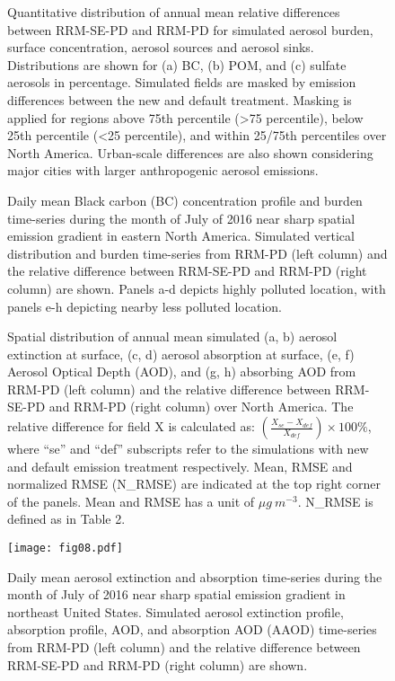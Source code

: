 \documentclass[journal abbreviation, manuscript]{copernicus}
\begin{document}
\clearpage
\begin{figure}[t]
\caption{Quantitative distribution of annual mean relative differences between RRM-SE-PD and RRM-PD for simulated aerosol burden, surface concentration, aerosol sources and aerosol sinks. Distributions are shown for (a) BC, (b) POM, and (c) sulfate aerosols in percentage. Simulated fields are masked by emission differences between the new and default treatment. Masking is applied for regions above 75th percentile (>75 percentile), below 25th percentile (<25 percentile), and within 25/75th percentiles over North America. Urban-scale differences are also shown considering major cities with larger anthropogenic aerosol emissions.}
\end{figure}

\clearpage
\begin{figure}[t]
\caption{Daily mean Black carbon (BC) concentration profile and burden time-series during the month of July of 2016 near sharp spatial emission gradient in eastern North America. Simulated vertical distribution and burden time-series from RRM-PD (left column) and the relative difference between RRM-SE-PD and RRM-PD (right column) are shown. Panels a-d depicts highly polluted location, with panels e-h depicting nearby less polluted location.}
\end{figure}

\clearpage
\begin{figure}[t]
\caption{Spatial distribution of annual mean simulated (a, b) aerosol extinction at surface, (c, d) aerosol absorption at surface, (e, f) Aerosol Optical Depth (AOD), and (g, h) absorbing AOD from RRM-PD (left column) and the relative difference between RRM-SE-PD and RRM-PD (right column) over North America. The relative difference for field X is calculated as: $(\frac{X_{se}-X_{def}}{X_{def}}) \times 100 \%$, where “se” and “def” subscripts refer to the simulations with new and default emission treatment respectively. Mean, RMSE and normalized RMSE (N\_RMSE) are indicated at the top right corner of the panels. Mean and RMSE has a unit of $\mu{g}\ m^{-3}$. N\_RMSE is defined as in Table 2.}
\end{figure}

\clearpage
\begin{figure}[t]
\texttt{[image: fig08.pdf]}
\caption{Daily mean aerosol extinction and absorption time-series during the month of July of 2016 near sharp spatial emission gradient in northeast United States. Simulated aerosol extinction profile, absorption profile, AOD, and absorption AOD (AAOD) time-series from RRM-PD (left column) and the relative difference between RRM-SE-PD and RRM-PD (right column) are shown.}
\end{figure}
\end{document}
